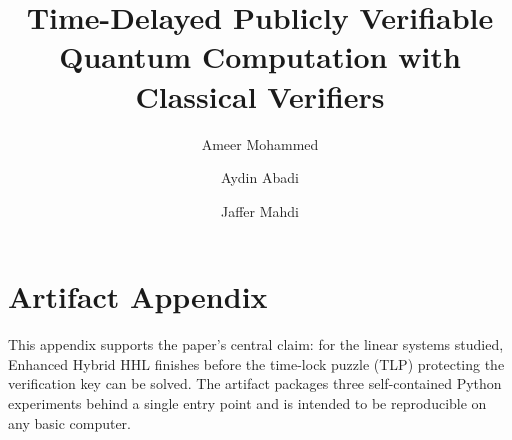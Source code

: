 \documentclass[nonacm,sigconf]{acmart}
\begin{document}
\title{Time-Delayed Publicly Verifiable Quantum Computation with Classical Verifiers}

\author{Ameer Mohammed}

\author{Aydin Abadi}

\author{Jaffer Mahdi}
\maketitle





\appendix


\section{Artifact Appendix}

This appendix supports the paper's central claim: for the linear
systems studied, Enhanced Hybrid HHL finishes before the time-lock
puzzle (TLP) protecting the verification key can be solved.  The
artifact packages three self-contained Python experiments behind a
single entry point and is intended to be reproducible on any basic computer.
\end{document}
